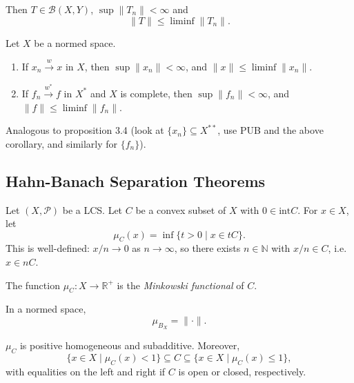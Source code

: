 \documentclass[12pt]{article}
\begin{document}
Then $T \in \mathcal{B}(X, Y)$, $\sup \|T_n\| < \infty$ and
\[
\|T\| \leq \liminf \|T_n\|.
\]

\begin{proposition}
	Let $X$ be a normed space.
	\begin{enumerate}[\normalfont(i)]
		\item If $x_n \overset w\to x$ in $X$, then $\sup \|x_n\| < \infty$, and $\|x\| \leq \liminf \|x_n\|$.
		\item If $f_n \overset {w^{\ast}}\to f$ in $X^{\ast}$ and $X$ is complete, then $\sup \|f_n\| < \infty$, and $\|f\| \leq \liminf \|f_n\|$.
	\end{enumerate}
\end{proposition}

\begin{proofbox}
	Analogous to proposition 3.4 (look at $\{x_n\} \subseteq X^{\ast\ast}$, use PUB and the above corollary, and similarly for $\{f_n\}$).
\end{proofbox}

\subsection{Hahn-Banach Separation Theorems}%
\label{sub:sep_thms}

Let $(X, \mathcal{P})$ be a LCS. Let $C$ be a convex subset of $X$ with $0 \in \mathrm{int} C$. For $x \in X$, let
\[
	\mu_C(x) = \inf \{t > 0 \mid x \in tC\}.
\]
This is well-defined: $x/n \to 0$ as $n \to \infty$, so there exists $n \in \mathbb{N}$ with $x/n \in C$, i.e. $x \in nC$.

The function $\mu_C : X \to \mathbb{R}^+$ is the \emph{Minkowski functional} of $C$.

\begin{exbox}
	In a normed space,
	\[
	\mu_{B_X} = \|\cdot\|.
	\]
	
\end{exbox}


\begin{lemma}
	$\mu_C$ is positive homogeneous and subadditive. Moreover,
	\[
		\{x \in X \mid \mu_C(x) < 1 \} \subseteq C \subseteq \{x \in X \mid \mu_C(x) \leq 1\},
	\]
	with equalities on the left and right if $C$ is open or closed, respectively.
\end{lemma}
\end{document}
